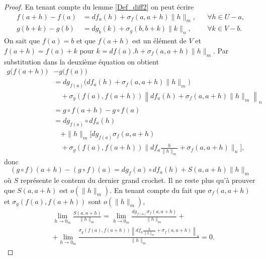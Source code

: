 \begin{proof}
 En tenant compte du lemme \ref{Def_diff2} on peut écrire 
 \begin{subequations}
	 \begin{align}
		f(a+h)-f(a)&=df_a(h)+\sigma_f(a,a+h)\|h\|_m,	&&\forall h\in U-a,\\
		g(b+k)-g(b)&=dg_b(k)+\sigma_g(b,b+k)\|k\|_n,	&&\forall k\in V-b.
	 \end{align}
 \end{subequations}
On sait que $f(a)=b$ et que $f(a+h)$ est  un élément de $V$ et $f(a+h)=f(a)+k$ pour $k=df(a).h+\sigma_f(a,a+h)\|h\|_m$.  Par substitution dans la deuxième équation on obtient 
\begin{equation}
	\begin{aligned}
		g\big(f(a+h)\big)& - g\big(f(a)\big)\\ 
        &=dg_{f(a)}\Big(df_a(h)+\sigma_f(a,a+h)\|h\|_m\Big)\\
		&\quad+\sigma_g\left(f(a), f(a+h)\right)\left\| df_a(h)+\sigma_f(a,a+h)\|h\|_m\right \|_n\\
		&=g\circ f (a+h) - g\circ f (a)\\
        &= dg_{f(a)}\circ df_a(h) \\
        &\quad +\|h\|_m\Big[ dg_{f(a)}\sigma_f(a,a+h)\\
		&\quad+\sigma_g\left(f(a), f(a+h)\right)\big\| df_a\frac{h}{\|h\|_m}+\sigma_f(a,a+h)\big \|_n\Big],
	\end{aligned}
\end{equation}
donc 
\begin{equation}
	(g\circ f) (a+h) - (g\circ f) (a) = dg_f(a)\circ df_a(h) + S(a,a+h) \|h\|_m
\end{equation}
où $S$ représente le contenu du dernier grand crochet. Il ne reste plus qu'à prouver que $S(a,a+h)$ est $o(\|h\|_m)$. En tenant compte du fait que $\sigma_f(a,a+h)$ et $\sigma_g\left(f(a), f(a+h)\right)$ sont $o (\|h\|_m)$,
\begin{equation}
  \begin{aligned}
      & \lim_{h\to 0_m} \frac{S(a,a+h)}{\|h\|_m}= \lim_{h\to 0_m}\frac{dg_{f(a)}\sigma_f(a,a+h)}{\|h\|_m}+ \\
& + \lim_{h\to 0_m}\frac{\sigma_g\left(f(a), f(a+h)\right)\left\| df_a\frac{h}{\|h\|_m}+\sigma_f(a,a+h)\right \|_n}{\|h\|_m} = 0.
  \end{aligned}
\end{equation}
\end{proof}

